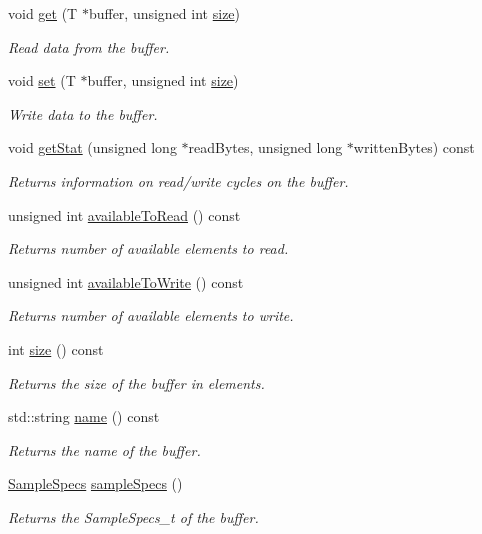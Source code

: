 \begin{DoxyCompactItemize}
\item 
void \hyperlink{group__Audio_ga3923df13e2115ece2a5f4969a9b2f890}{get} (T $\ast$buffer, unsigned int \hyperlink{group__Audio_ga8e5076598374af82eb754cea0c88d12d}{size})
\begin{DoxyCompactList}\small\item\em Read data from the buffer. \end{DoxyCompactList}\item 
void \hyperlink{group__Audio_gab60ad480d2ebe4b2aa526d31d808be7a}{set} (T $\ast$buffer, unsigned int \hyperlink{group__Audio_ga8e5076598374af82eb754cea0c88d12d}{size})
\begin{DoxyCompactList}\small\item\em Write data to the buffer. \end{DoxyCompactList}\item 
void \hyperlink{group__Audio_ga012421a899e2da4cf994556ccfcb1880}{get\-Stat} (unsigned long $\ast$read\-Bytes, unsigned long $\ast$written\-Bytes) const 
\begin{DoxyCompactList}\small\item\em Returns information on read/write cycles on the buffer. \end{DoxyCompactList}\item 
unsigned int \hyperlink{group__Audio_ga75e3bbb71d5eeb19224f1503d58e1b0a}{available\-To\-Read} () const 
\begin{DoxyCompactList}\small\item\em Returns number of available elements to read. \end{DoxyCompactList}\item 
unsigned int \hyperlink{group__Audio_ga440f66059781b20486d6d6c160e4f0ed}{available\-To\-Write} () const 
\begin{DoxyCompactList}\small\item\em Returns number of available elements to write. \end{DoxyCompactList}\item 
int \hyperlink{group__Audio_ga8e5076598374af82eb754cea0c88d12d}{size} () const 
\begin{DoxyCompactList}\small\item\em Returns the size of the buffer in elements. \end{DoxyCompactList}\item 
std\-::string \hyperlink{group__Audio_gad287c03d36b07643b960d531b5553109}{name} () const 
\begin{DoxyCompactList}\small\item\em Returns the name of the buffer. \end{DoxyCompactList}\item 
\hyperlink{structNl_1_1SampleSpecs}{Sample\-Specs} \hyperlink{group__Audio_ga679616fc01beaa6db6774a5cdabc5cd9}{sample\-Specs} ()
\begin{DoxyCompactList}\small\item\em Returns the Sample\-Specs\-\_\-t of the buffer. \end{DoxyCompactList}\end{DoxyCompactItemize}


